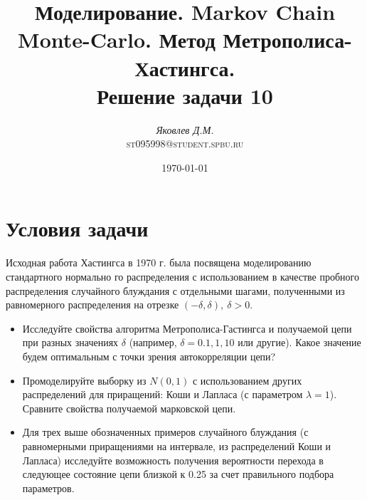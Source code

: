 \documentclass{article}
\title{Моделирование. Markov Chain Monte-Carlo. Метод Метрополиса-Хастингса. \\
	Решение задачи 10}
\author{\emph{Яковлев Д.М.}\\\textsc{st095998@student.spbu.ru}}
\date{\today}
\begin{document}
	\maketitle
	\nocite{RomGu,ankorMLE}
	\section{Условия задачи}
	Исходная работа Хастингса в 1970 г. была посвящена моделированию стандартного нормально
	го распределения с использованием в качестве пробного распределения случайного блуждания
	с отдельными шагами, полученными из равномерного распределения на отрезке $(-\delta, \delta),~ \delta>0$.
	\begin{itemize}
		\item Исследуйте свойства алгоритма Метрополиса-Гастингса и получаемой цепи при разных
		значениях $\delta$ (например, $\delta = 0.1,1,10$ или другие). Какое значение будем оптимальным
		с точки зрения автокорреляции цепи? 
		\item Промоделируйте выборку из $N(0,1)$ с использованием других распределений для приращений: Коши и Лапласа (с параметром $\lambda = 1$). Сравните свойства получаемой марковской
		цепи. 
		\item Для трех выше обозначенных примеров случайного блуждания (с равномерными приращениями на интервале, из распределений Коши и Лапласа) исследуйте возможность получения вероятности перехода в следующее состояние цепи близкой к 0.25 за счет правильного
		подбора параметров. 
	\end{itemize}
	
	
\end{document}
